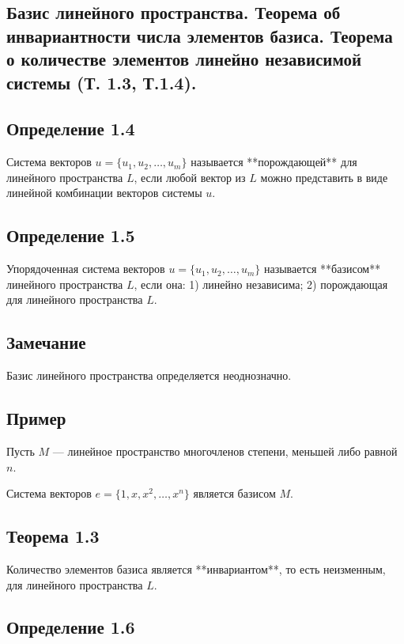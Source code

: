 {
\subsection{Базис линейного пространства. Теорема об инвариантности числа элементов базиса. Теорема о количестве элементов линейно независимой системы (Т. 1.3, Т.1.4).}

\subsection*{Определение 1.4}

Система векторов \( u = \{ u_1, u_2, \ldots, u_m \} \) называется **порождающей** для линейного пространства \( L \), если любой вектор из \( L \) можно представить в виде линейной комбинации векторов системы \( u \).

\subsection*{Определение 1.5}

Упорядоченная система векторов \( u = \{ u_1, u_2, \ldots, u_m \} \) называется **базисом** линейного пространства \( L \), если она:
1) линейно независима;
2) порождающая для линейного пространства \( L \).

\subsection*{Замечание}

Базис линейного пространства определяется неоднозначно.

\subsection*{Пример}

Пусть \( M \) — линейное пространство многочленов степени, меньшей либо равной \( n \).

Система векторов \( e = \{ 1, x, x^2, \ldots, x^n \} \) является базисом \( M \).

\subsection*{Теорема 1.3}

Количество элементов базиса является **инвариантом**, то есть неизменным, для линейного пространства \( L \).

\subsection*{Определение 1.6}

}

